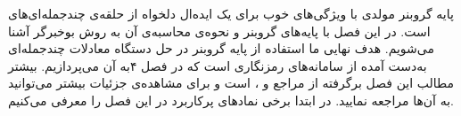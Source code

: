 پایه‌  گروبنر مولدی با ویژگی‌های خوب برای یک ایده‌ال دلخواه از حلقه‌ی چندجمله‌ای‌های است.
در این فصل با پایه‌های گروبنر و نحوه‌ی محاسبه‌ی آن به روش بوخبرگر آشنا می‌شویم. هدف نهایی ما استفاده از پایه‌  گروبنر در حل دستگاه معادلات چندجمله‌ای  به‌دست آمده از سامانه‌های رمزنگاری است که در فصل ۴به آن می‌پردازیم. بیشتر مطالب این فصل برگرفته از مراجع 
\cite{cca1_kreuzer, cca2_kreuzer}
و
\cite{IVAcox}، 
است و برای مشاهده‌ی جزئیات بیشتر می‌توانید به آن‌ها مراجعه نمایید.  در ابتدا برخی نمادهای پرکاربرد در این فصل را  معرفی می‌کنیم. 
